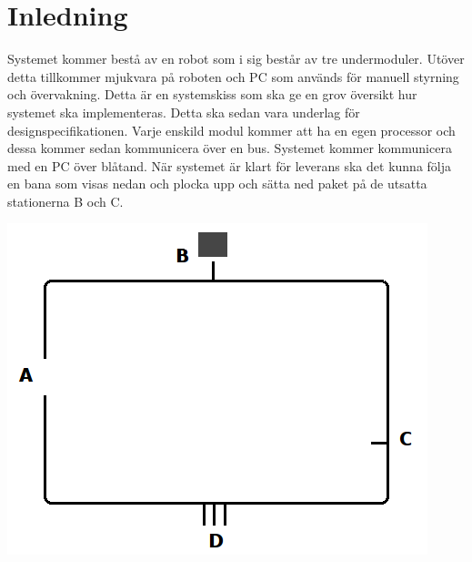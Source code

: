 \section{Inledning}
Systemet kommer bestå av en robot som i sig består av tre undermoduler. Utöver detta tillkommer mjukvara på roboten och PC som används för manuell styrning och övervakning. Detta är en systemskiss som ska ge en grov översikt hur systemet ska implementeras. Detta ska sedan vara underlag för designspecifikationen. 
\newline
\newline
Varje enskild modul kommer att ha en egen processor och dessa kommer sedan kommunicera över en bus. Systemet kommer kommunicera med en PC över blåtand. När systemet är klart för leverans ska det kunna följa en bana som visas nedan och plocka upp och sätta ned paket på de utsatta stationerna B och C. 

\centerline{\includegraphics[scale=0.4]{figur}}